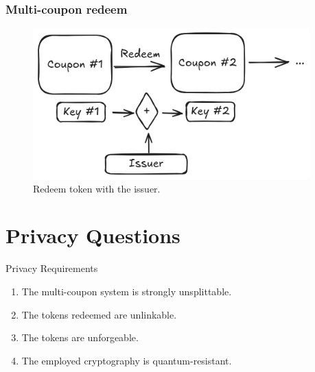\documentclass[presentation]{beamer}
\begin{document}
\begin{frame}
  \frametitle{Multi-coupon redeem}
\begin{figure}
  \begin{center}
    \includegraphics[width=0.95\textwidth]{redeem-token}
  \end{center}
  \caption{Redeem token with the issuer.}\label{fig:redeem-token}
\end{figure}
\end{frame}

\section{Privacy Questions}
\begin{frame}{Privacy Requirements}
 \begin{enumerate}
   \item The multi-coupon system is \alert{strongly unsplittable}.
     \pause
   \item The tokens redeemed are \alert{unlinkable}.
     \pause
   \item The tokens are \alert{unforgeable}.
     \pause
   \item The employed cryptography is \alert{quantum-resistant}.
 \end{enumerate}
\end{frame}
\end{document}
